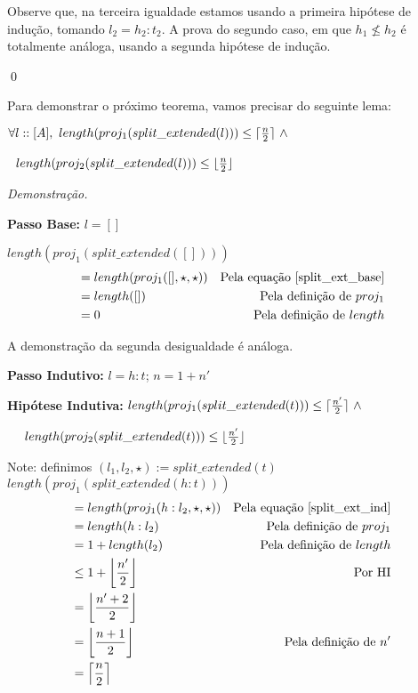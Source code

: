 \documentclass[12pt, oneside, a4paper,english,brazil]{abntex2}
\DeclarePairedDelimiter\floor{\lfloor}{\rfloor}
\DeclarePairedDelimiter\ceil{\lceil}{\rceil}
\begin{document}
Observe que, na terceira igualdade estamos usando a primeira hip\'otese de indu\c{c}\~ao, tomando $l_{2} = h_{2} : t_{2}$. A prova do segundo caso, em que $h_{1} \not\le h_{2}$ \'e totalmente an\'aloga, usando a segunda hip\'otese de indu\c{c}\~ao.

\qed

Para demonstrar o pr\'oximo teorema, vamos precisar do seguinte lema:

\begin{lema}\label{split_half}
  $\forall l :: [A], \,\, length(proj_{1}(split\_extended(l))) \le \ceil{\frac{n}{2}}\,\, \wedge$

  \qquad \qquad \qquad \qquad \,\, $length(proj_{2}(split\_extended(l))) \le \floor{\frac{n}{2}}$
\end{lema}

\noindent \textit{Demonstra\c{c}\~ao.}

\textbf{Passo Base: } $l = []$

$length(proj_{1}(split\_extended([])))$
\begin{align*}
  &= length(proj_{1}([], \star, \star)) &\text{Pela equa\c{c}\~ao \ref{split_ext_base}}\\
  &= length([]) &\text{Pela defini\c{c}\~ao de $proj_{1}$}\\
  &= 0 &\text{Pela defini\c{c}\~ao de $length$}
\end{align*}

A demonstra\c{c}\~ao da segunda desigualdade \'e an\'aloga.

\textbf{Passo Indutivo: } $l = h : t$; $n = 1 + n'$

\textbf{Hip\'otese Indutiva: } $length(proj_{1}(split\_extended(t))) \le \ceil{\frac{n'}{2}} \,\, \wedge$

\qquad \qquad \qquad \qquad \quad \,\,\,\,\,\, $length(proj_{2}(split\_extended(t))) \le \floor{\frac{n'}{2}}$

Note: definimos $(l_{1}, l_{2}, \star) := split\_extended(t)$\\

$length(proj_{1}(split\_extended(h : t)))$
\begin{align*}
  &= length(proj_{1}(h : l_{2}, \star, \star)) &\text{Pela equa\c{c}\~ao \ref{split_ext_ind}}\\
  &= length(h : l_{2}) &\text{Pela defini\c{c}\~ao de $proj_{1}$}\\
  &= 1 + length(l_{2}) &\text{Pela defini\c{c}\~ao de $length$}\\
  &\le 1 + \floor*{\frac{n'}{2}} &\text{Por HI}\\
  &= \floor*{\frac{n' + 2}{2}}\\
  &= \floor*{\frac{n + 1}{2}} &\text{Pela defini\c{c}\~ao de $n'$}\\
  &= \ceil*{\frac{n}{2}}
\end{align*}
\end{document}
